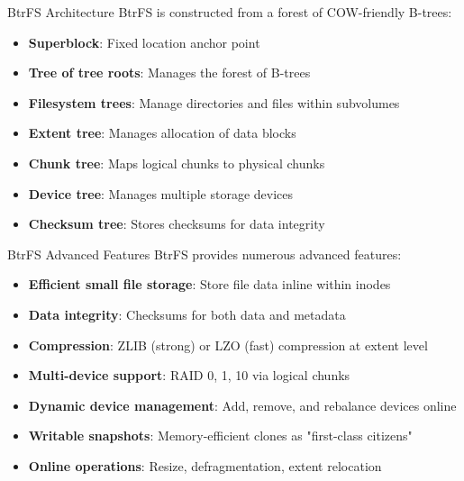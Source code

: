 \begin{theorem}{BtrFS Architecture}
    BtrFS is constructed from a forest of COW-friendly B-trees:
    \begin{itemize}
        \item \textbf{Superblock}: Fixed location anchor point
        \item \textbf{Tree of tree roots}: Manages the forest of B-trees
        \item \textbf{Filesystem trees}: Manage directories and files within subvolumes
        \item \textbf{Extent tree}: Manages allocation of data blocks
        \item \textbf{Chunk tree}: Maps logical chunks to physical chunks
        \item \textbf{Device tree}: Manages multiple storage devices
        \item \textbf{Checksum tree}: Stores checksums for data integrity
    \end{itemize}
\end{theorem}

\begin{corollary}{BtrFS Advanced Features}
    BtrFS provides numerous advanced features:
    \begin{itemize}
        \item \textbf{Efficient small file storage}: Store file data inline within inodes
        \item \textbf{Data integrity}: Checksums for both data and metadata
        \item \textbf{Compression}: ZLIB (strong) or LZO (fast) compression at extent level
        \item \textbf{Multi-device support}: RAID 0, 1, 10 via logical chunks
        \item \textbf{Dynamic device management}: Add, remove, and rebalance devices online
        \item \textbf{Writable snapshots}: Memory-efficient clones as "first-class citizens"
        \item \textbf{Online operations}: Resize, defragmentation, extent relocation
    \end{itemize}
\end{corollary}

